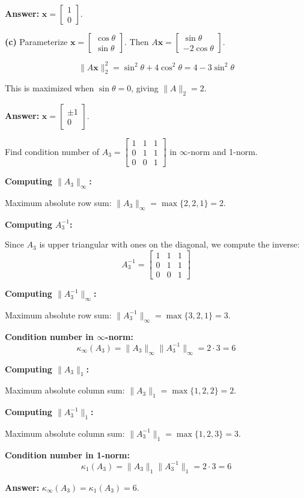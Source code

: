 \documentclass[reqno]{exam}
\begin{document}
\begin{questions}
\begin{solution}
\textbf{Answer:} $\mathbf{x} = \begin{bmatrix} 1 \\ 0 \end{bmatrix}$.

\textbf{(c)} Parameterize $\mathbf{x} = \begin{bmatrix} \cos\theta \\ \sin\theta \end{bmatrix}$. Then $A\mathbf{x} = \begin{bmatrix} \sin\theta \\ -2\cos\theta \end{bmatrix}$.

\[
\|A\mathbf{x}\|_2^2 = \sin^2\theta + 4\cos^2\theta = 4 - 3\sin^2\theta
\]

This is maximized when $\sin\theta = 0$, giving $\|A\|_2 = 2$.

\textbf{Answer:} $\mathbf{x} = \begin{bmatrix} \pm 1 \\ 0 \end{bmatrix}$.
\end{solution}

\newpage 
\question[10] Find condition number of $A_3 = \begin{bmatrix} 1 & 1 & 1 \\ 0 & 1 & 1 \\ 0 & 0 & 1 \end{bmatrix}$ in $\infty$-norm and 1-norm.

\begin{solution}
\textbf{Computing $\|A_3\|_\infty$:}

Maximum absolute row sum: $\|A_3\|_\infty = \max\{2, 2, 1\} = 2$.

\textbf{Computing $A_3^{-1}$:}

Since $A_3$ is upper triangular with ones on the diagonal, we compute the inverse:
\[
A_3^{-1} = \begin{bmatrix} 1 & 1 & 1 \\ 0 & 1 & 1 \\ 0 & 0 & 1 \end{bmatrix}
\]

\textbf{Computing $\|A_3^{-1}\|_\infty$:}

Maximum absolute row sum: $\|A_3^{-1}\|_\infty = \max\{3, 2, 1\} = 3$.

\textbf{Condition number in $\infty$-norm:}
\[
\kappa_\infty(A_3) = \|A_3\|_\infty \|A_3^{-1}\|_\infty = 2 \cdot 3 = 6
\]

\textbf{Computing $\|A_3\|_1$:}

Maximum absolute column sum: $\|A_3\|_1 = \max\{1, 2, 2\} = 2$.

\textbf{Computing $\|A_3^{-1}\|_1$:}

Maximum absolute column sum: $\|A_3^{-1}\|_1 = \max\{1, 2, 3\} = 3$.

\textbf{Condition number in 1-norm:}
\[
\kappa_1(A_3) = \|A_3\|_1 \|A_3^{-1}\|_1 = 2 \cdot 3 = 6
\]

\textbf{Answer:} $\kappa_\infty(A_3) = \kappa_1(A_3) = 6$.
\end{solution}

\end{questions}
\end{document}
